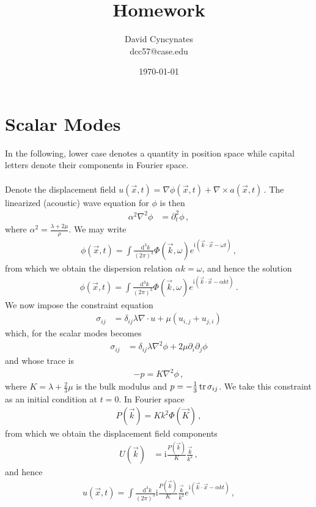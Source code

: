 \documentclass{article}
\title{Homework}
\author{David Cyncynates \\ dcc57@case.edu}
\date{\today}
\newcommand*\diff{\mathop{}\!\mathrm{d}}
\newcommand*\te[1]{\text{#1}}
\newcommand*\f[2]{\frac{#1}{#2}}
\newcommand*\I{\te{i}}
\begin{document}
\maketitle
\section{Scalar Modes}
In the following, lower case denotes a quantity in position space while capital letters denote their components in Fourier space.
\\\\
Denote the displacement field $u(\vec x,t)=\nabla\phi(\vec x,t)+\nabla\times a(\vec x,t)$\,. The linearized (acoustic) wave equation for $\phi$ is then
\begin{align}
\alpha^2\nabla^2\phi&=\partial_t^2\phi\,,
\end{align}
where $\alpha^2=\f{\lambda+2\mu}{\rho}$. We may write
\begin{align}
\phi(\vec x,t)=\int\f{\diff^3 k}{(2\pi)^3}\Phi(\vec k,\omega)e^{\I(\vec k\cdot\vec x-\omega t)}\,,
\end{align}
from which we obtain the dispersion relation $\alpha k=\omega$, and hence the solution
\begin{align}
\phi(\vec x,t)=\int\f{\diff^3 k}{(2\pi)^3}\Phi(\vec k,\omega)e^{\I(\vec k\cdot\vec x-\alpha k t)}\,.
\end{align}
We now impose the constraint equation
\begin{align}
\sigma_{ij}&=\delta_{ij}\lambda\nabla\cdot u+\mu(u_{i,j}+u_{j,i})
\end{align}
which, for the scalar modes becomes
\begin{align}
\sigma_{ij}&=\delta_{ij}\lambda\nabla^2\phi+2\mu\partial_i\partial_j\phi
\end{align}
and whose trace is
\begin{align}
-p=K\nabla^2\phi\,,
\end{align}
where $K=\lambda+\f23\mu$ is the bulk modulus and $p=-\f13\tr\sigma_{ij}$. We take this constraint as an initial condition at $t=0$. In Fourier space
\begin{align}
P(\vec k)=Kk^2\Phi(\vec K)\,,
\end{align}
from which we obtain the displacement field components
\begin{align}
U(\vec k)&=\I\f{P(\vec k)}{K}\f{\vec k}{k^2}\,,
\end{align}
and hence
\begin{align}
u(\vec x,t)=\int\f{\diff^3 k}{(2\pi)^3}\I\f{P(\vec k)}{K}\f{\vec k}{k^2}e^{\I(\vec k\cdot\vec x-\alpha k t)}\,,
\end{align}
\end{document}
